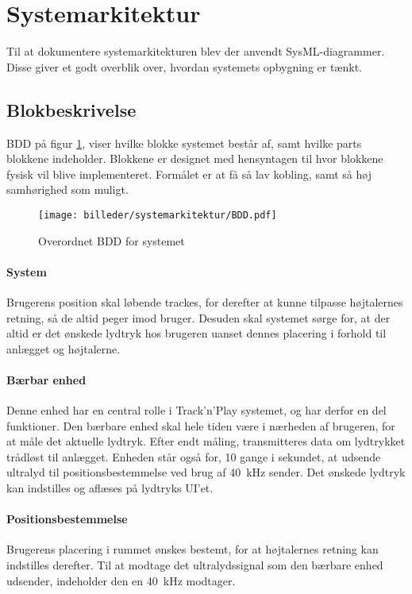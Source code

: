 \newpage
\section{Systemarkitektur}
\label{chap:systemarkitektur}

Til at dokumentere systemarkitekturen blev der anvendt SysML-diagrammer. Disse giver et godt overblik over, hvordan systemets opbygning er tænkt.

\subsection{Blokbeskrivelse}

BDD på figur \ref{fig:bdd Track_N_Play}, viser hvilke blokke systemet består af, samt hvilke parts blokkene indeholder.
Blokkene er designet med hensyntagen til hvor blokkene fysisk vil blive implementeret. Formålet er at få så lav kobling, samt så høj samhørighed som muligt. 



\begin{figure}[htb]
\texttt{[image: billeder/systemarkitektur/BDD.pdf]}
\caption{Overordnet BDD for systemet}
\label{fig:bdd Track_N_Play}
\end{figure}



\paragraph{System} Brugerens position skal løbende trackes, for derefter at kunne tilpasse højtalernes retning, så de altid peger imod bruger. Desuden skal systemet sørge for, at der altid er det ønskede lydtryk hos brugeren uanset dennes placering i forhold til anlægget og højtalerne.

\paragraph{Bærbar enhed} Denne enhed har en central rolle i Track'n'Play systemet, og har derfor en del funktioner. Den bærbare enhed skal hele tiden være i nærheden af brugeren, for at måle det aktuelle lydtryk. Efter endt måling, transmitteres data om lydtrykket trådløst til anlægget. Enheden står også for, 10 gange i sekundet, at udsende ultralyd til positionsbestemmelse ved brug af \SI{40}{kHz} sender. Det ønskede lydtryk kan indstilles og aflæses på lydtryks UI'et.

\paragraph{Positionsbestemmelse} Brugerens placering i rummet ønskes bestemt, for at højtalernes retning kan indstilles derefter.
Til at modtage det ultralydssignal som den bærbare enhed udsender, indeholder den en \SI{40}{kHz} modtager.

